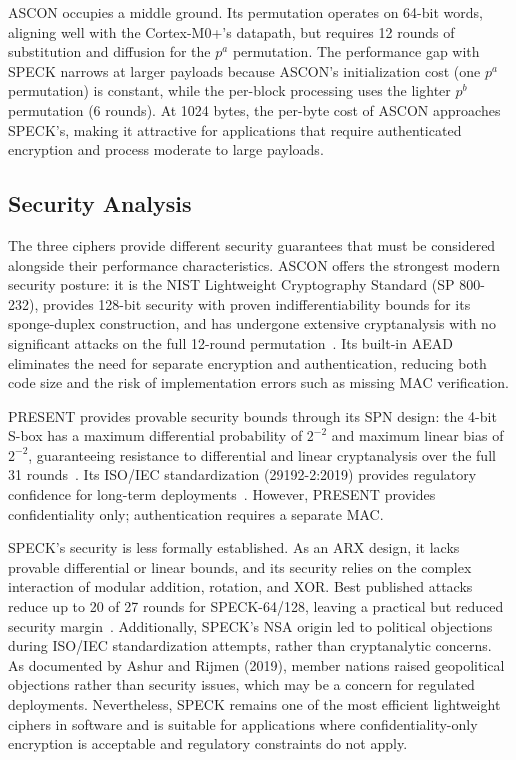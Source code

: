 \documentclass[12pt]{report}
\begin{document}
ASCON occupies a middle ground. Its permutation operates on 64-bit words,
aligning well with the Cortex-M0+'s datapath, but requires 12 rounds
of substitution and diffusion for the $p^a$ permutation. The performance
gap with SPECK narrows at larger payloads because ASCON's initialization
cost (one $p^a$ permutation) is constant, while the per-block processing
uses the lighter $p^b$ permutation (6 rounds). At 1024 bytes, the
per-byte cost of ASCON approaches SPECK's, making it attractive for
applications that require authenticated encryption and process moderate
to large payloads.

\subsection*{Security Analysis}

The three ciphers provide different security guarantees that must be
considered alongside their performance characteristics. ASCON offers
the strongest modern security posture: it is the NIST Lightweight
Cryptography Standard (SP 800-232), provides 128-bit security with
proven indifferentiability bounds for its sponge-duplex construction,
and has undergone extensive cryptanalysis with no significant attacks
on the full 12-round permutation~\cite{dobraunig2016ascon,nist2025ascon}.
Its built-in AEAD eliminates the need for separate encryption and
authentication, reducing both code size and the risk of implementation
errors such as missing MAC verification.

PRESENT provides provable security bounds through its SPN design: the
4-bit S-box has a maximum differential probability of $2^{-2}$ and
maximum linear bias of $2^{-2}$, guaranteeing resistance to differential
and linear cryptanalysis over the full 31 rounds~\cite{bogdanov2007present}.
Its ISO/IEC standardization (29192-2:2019) provides regulatory confidence
for long-term deployments~\cite{iso29192}. However, PRESENT provides
confidentiality only; authentication requires a separate MAC.

SPECK's security is less formally established. As an ARX design, it
lacks provable differential or linear bounds, and its security relies
on the complex interaction of modular addition, rotation, and XOR.
Best published attacks reduce up to 20 of 27 rounds for SPECK-64/128,
leaving a practical but reduced security margin~\cite{ashur2018simon}.
Additionally, SPECK's NSA origin led to political objections during ISO/IEC
standardization attempts, rather than cryptanalytic concerns. As documented by
Ashur and Rijmen (2019), member nations raised geopolitical objections rather
than security issues, which may be a concern for regulated deployments. Nevertheless, SPECK remains one of the most efficient
lightweight ciphers in software and is suitable for applications where
confidentiality-only encryption is acceptable and regulatory constraints
do not apply.
\end{document}
